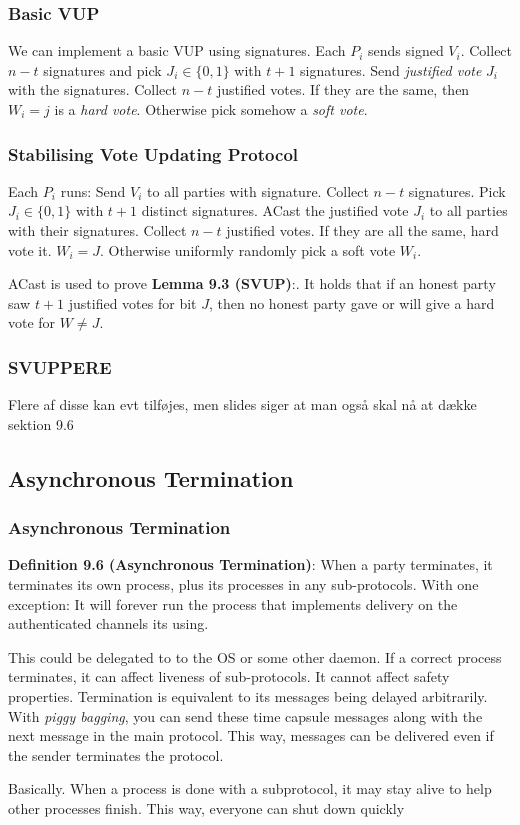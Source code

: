 \documentclass[14pt]{beamer}
\begin{document}
            \begin{frame}
                \frametitle{Basic VUP}
                    We can implement a basic VUP using signatures. Each $P_i$ sends signed $V_i$. Collect $n-t$ signatures and pick $J_i \in \{0, 1\}$ with $t+1$ signatures. Send \textit{justified vote} $J_i$ with the signatures. Collect $n-t$ justified votes. If they are the same, then $W_i = j$ is a \textit{hard vote}. Otherwise pick somehow a \textit{soft vote}. 
            \end{frame}
            \begin{frame}
                \frametitle{Stabilising Vote Updating Protocol}
                    Each $P_i$ runs: Send $V_i$ to all parties with signature. Collect $n-t$ signatures. Pick $J_i \in \{0, 1\}$ with $t+1$ distinct signatures. ACast the justified vote $J_i$ to all parties with their signatures. Collect $n-t$ justified votes. If they are all the same, hard vote it. $W_i = J$. Otherwise uniformly randomly pick a soft vote $W_i$. 

                    ACast is used to prove \textbf{Lemma 9.3 (SVUP)}:. It holds that if an honest party saw $t+1$ justified votes for bit $J$, then no honest party gave or will give a hard vote for $W \neq J$. 
            \end{frame}

            \begin{frame}
                \frametitle{SVUPPERE}
                    Flere af disse kan evt tilføjes, men slides siger at man også skal nå at dække sektion 9.6
            \end{frame}

    \subsection{Asynchronous Termination}
            \begin{frame}
                \frametitle{Asynchronous Termination}
                    \textbf{Definition 9.6 (Asynchronous Termination)}: When a party terminates, it terminates its own process, plus its processes in any sub-protocols. With one exception: It will forever run the process that implements delivery on the authenticated channels its using. 

                    This could be delegated to to the OS or some other daemon. If a correct process terminates, it can affect liveness of sub-protocols. It cannot affect safety properties. Termination is equivalent to its messages being delayed arbitrarily. With \textit{piggy bagging}, you can send these time capsule messages along with the next message in the main protocol. This way, messages can be delivered even if the sender terminates the protocol. 

                    Basically. When a process is done with a subprotocol, it may stay alive to help other processes finish. This way, everyone can shut down quickly
            \end{frame}
\end{document}
